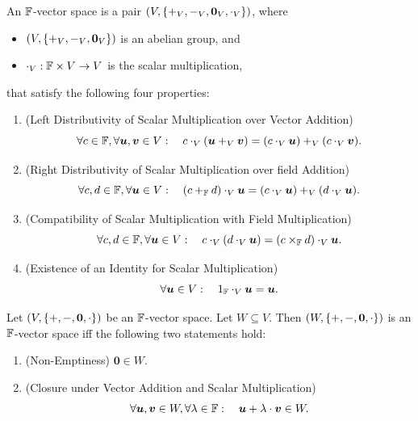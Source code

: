 \documentclass[11pt,reqno]{amsart}
\begin{document}
\begin{Def}
An $\mathbb{F}$-vector space
is a pair $\Br{V,\set{+_V,-_V,\bm0_V,\cdot_V}}$, where
\begin{itemize}
\item $\Br{V,\set{+_V,-_V,\bm0_V}}$ is an abelian group, and
\item $\cdot_V:\mathbb{F}\times V\to V$ is the scalar multiplication,
\end{itemize}
that satisfy the following four properties:
\begin{enumerate}
\item (Left Distributivity of Scalar Multiplication over Vector Addition)
\[
\forall c\in\mathbb{F},\forall\bm u,\bm v\in V:\quad
c\cdot_V(\bm u+_V\bm v)=(c\cdot_V\bm u)+_V(c\cdot_V\bm v).
\]

\item (Right Distributivity of Scalar Multiplication over field Addition)
\[
\forall c,d\in\mathbb{F},\forall\bm u\in V:\quad
(c+_{\mathbb{F}} d)\cdot_V\bm u=(c\cdot_V\bm u)+_V(d\cdot_V\bm u).
\]

\item (Compatibility of Scalar Multiplication with Field Multiplication)
\[
\forall c,d\in\mathbb{F},\forall\bm u\in V:\quad
c\cdot_V(d\cdot_V\bm u)=(c\times_{\mathbb{F}} d)\cdot_V\bm u.
\]

\item (Existence of an Identity for Scalar Multiplication)
\[
\forall\bm u\in V:\quad 1_{\mathbb{F}}\cdot_V\bm u=\bm u.
\]
\end{enumerate}
\end{Def}

\begin{Thm}\label{thm:subspace-test}
Let
$\Br{V,\set{+,-,\bm0,\cdot}}$ be an $\mathbb{F}$-vector space.
Let $W\subseteq V$.
Then $\Br{W,\set{+,-,\bm0,\cdot}}$
is an $\mathbb{F}$-vector space iff the following two statements hold:
\begin{enumerate}
\item (Non-Emptiness) $\bm0\in W$.
\item (Closure under Vector Addition and Scalar Multiplication)
\[\forall\bm u,\bm v\in W,\forall\lambda\in\mathbb{F}:\quad
\bm u+\lambda\cdot\bm v\in W.\]
\end{enumerate}
\end{Thm}
\end{document}
